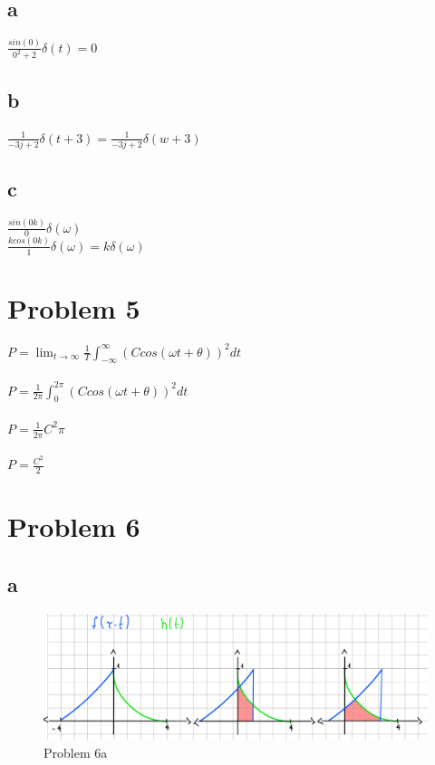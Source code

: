 \documentclass{article}
\begin{document}
\subsection*{a}
$\frac{sin(0)}{0^2+2}\delta (t)=0$
\subsection*{b}
$\frac{1}{-3j+2}\delta (t+3)=\frac{1}{-3j+2}\delta (w+3)$
\subsection*{c}
$\frac{sin(0k)}{0}\delta (\omega)$ \\
$\frac{kcos(0k)}{1}\delta (\omega)=k\delta(\omega)$
\section{Problem 5}
$P=\lim_{t\to\infty}\frac{1}{T}\int_{-\infty}^{\infty}(Ccos(\omega t +\theta))^2dt$ \\ \\
$P=\frac{1}{2\pi}\int_{0}^{2\pi}(Ccos(\omega t +\theta))^2dt$ \\ \\
$P=\frac{1}{2\pi}C^2\pi$ \\ \\
$P=\frac{C^2}{2}$
\section{Problem 6}
\subsection*{a}
\begin{figure}[H]
    \includegraphics[width=\textwidth]{Ex_6a.jpg}
    \caption{Problem 6a}
\end{figure}
\end{document}
